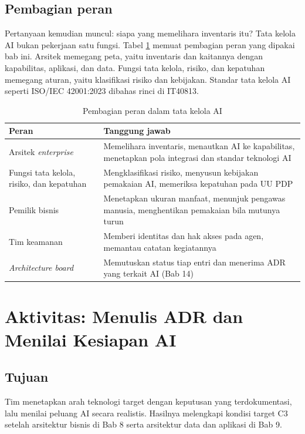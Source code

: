 \subsection*{Pembagian peran}

Pertanyaan kemudian muncul: siapa yang memelihara inventaris itu? Tata kelola
AI bukan pekerjaan satu fungsi. Tabel \ref{tab:ch10-peran} memuat pembagian
peran yang dipakai bab ini. Arsitek memegang peta, yaitu inventaris dan
kaitannya dengan kapabilitas, aplikasi, dan data. Fungsi tata kelola, risiko,
dan kepatuhan memegang aturan, yaitu klasifikasi risiko dan kebijakan.
Standar tata kelola AI seperti ISO/IEC 42001:2023 dibahas rinci di IT40813.

\begin{table}[!htb]
  \centering
  \caption{Pembagian peran dalam tata kelola AI}
  \label{tab:ch10-peran}
  \small
  \begin{tabularx}{\textwidth}{lX}
    \hline
    \textbf{Peran} & \textbf{Tanggung jawab} \\
    \hline
    Arsitek \textit{enterprise} & Memelihara inventaris, menautkan AI ke kapabilitas, menetapkan pola integrasi dan standar teknologi AI \\
    \hline
    Fungsi tata kelola, risiko, dan kepatuhan & Mengklasifikasi risiko, menyusun kebijakan pemakaian AI, memeriksa kepatuhan pada UU PDP \\
    \hline
    Pemilik bisnis & Menetapkan ukuran manfaat, menunjuk pengawas manusia, menghentikan pemakaian bila mutunya turun \\
    \hline
    Tim keamanan & Memberi identitas dan hak akses pada agen, memantau catatan kegiatannya \\
    \hline
    \textit{Architecture board} & Memutuskan status tiap entri dan menerima ADR yang terkait AI (Bab 14) \\
    \hline
  \end{tabularx}
\end{table}

\section{Aktivitas: Menulis ADR dan Menilai Kesiapan AI}

\subsection*{Tujuan}

Tim menetapkan arah teknologi target dengan keputusan yang terdokumentasi,
lalu menilai peluang AI secara realistis. Hasilnya melengkapi kondisi target
C3 setelah arsitektur bisnis di Bab 8 serta arsitektur data dan aplikasi di
Bab 9.

